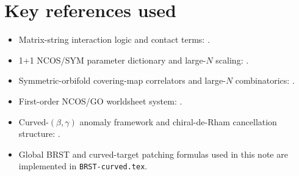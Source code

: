 \documentclass[11pt]{article}
\begin{document}
\section{Key references used}
\begin{itemize}
\item Matrix-string interaction logic and contact terms: \cite{dijkgraaf1997matrixstring,dijkgraaf2003matrixstringcontactterms}.
\item 1+1 NCOS/SYM parameter dictionary and large-$N$ scaling: \cite{klebanov200011dimensionalncosun}.
\item Symmetric-orbifold covering-map correlators and large-$N$ combinatorics: \cite{arutyunov1998orbifoldscattering,lunin2001correlationorbifolds,lunin2002threepointorbifolds,pakman2009diagramssymmetricorbifold,pakman2009extremalhurwitz}.
\item First-order NCOS/GO worldsheet system: \cite{gomis2000nonrelativisticclosedstringtheory}.
\item Curved-$(\beta,\gamma)$ anomaly framework and chiral-de-Rham cancellation structure: \cite{nekrasov2005curvedbetagammasystems,msv1999chiralderham,benzvi2008supersymmetrycdr}.
\item Global BRST and curved-target patching formulas used in this note are implemented in \texttt{BRST-curved.tex}.
\end{itemize}

\printbibliography
\end{document}
